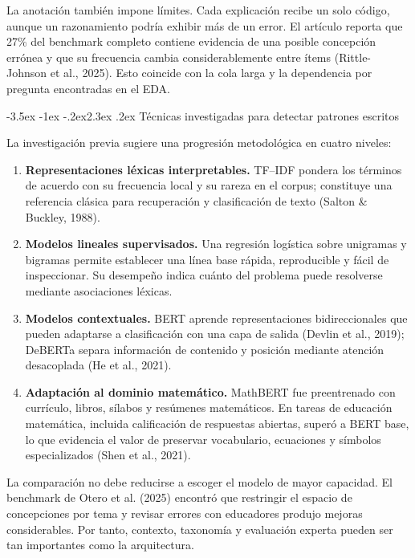 \documentclass[11pt,oneside,openany]{book}
\makeatletter
\renewcommand\section{\@startsection{section}{1}{\z@}%
  {-3.5ex \@plus -1ex \@minus -.2ex}{2.3ex \@plus .2ex}%
  {\normalfont\Large\sffamily\bfseries\color{AzulMedio}}}
\makeatother
\begin{document}
La anotación también impone límites. Cada explicación recibe un solo código,
aunque un razonamiento podría exhibir más de un error. El artículo reporta que
27\% del benchmark completo contiene evidencia de una posible concepción
errónea y que su frecuencia cambia considerablemente entre ítems
(Rittle-Johnson et al., 2025). Esto coincide con la cola larga y la dependencia
por pregunta encontradas en el EDA.

\section{Técnicas investigadas para detectar patrones escritos}

La investigación previa sugiere una progresión metodológica en cuatro niveles:

\begin{enumerate}
  \item \textbf{Representaciones léxicas interpretables.} TF--IDF pondera los
        términos de acuerdo con su frecuencia local y su rareza en el corpus;
        constituye una referencia clásica para recuperación y clasificación de
        texto (Salton \& Buckley, 1988).
  \item \textbf{Modelos lineales supervisados.} Una regresión logística sobre
        unigramas y bigramas permite establecer una línea base rápida,
        reproducible y fácil de inspeccionar. Su desempeño indica cuánto del
        problema puede resolverse mediante asociaciones léxicas.
  \item \textbf{Modelos contextuales.} BERT aprende representaciones
        bidireccionales que pueden adaptarse a clasificación con una capa de
        salida (Devlin et al., 2019); DeBERTa separa información de contenido y
        posición mediante atención desacoplada (He et al., 2021).
  \item \textbf{Adaptación al dominio matemático.} MathBERT fue preentrenado con
        currículo, libros, sílabos y resúmenes matemáticos. En tareas de
        educación matemática, incluida calificación de respuestas abiertas,
        superó a BERT base, lo que evidencia el valor de preservar vocabulario,
        ecuaciones y símbolos especializados (Shen et al., 2021).
\end{enumerate}

La comparación no debe reducirse a escoger el modelo de mayor capacidad. El
benchmark de Otero et al. (2025) encontró que restringir el espacio de
concepciones por tema y revisar errores con educadores produjo mejoras
considerables. Por tanto, contexto, taxonomía y evaluación experta pueden ser
tan importantes como la arquitectura.
\end{document}
